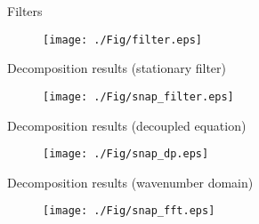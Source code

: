 \documentclass[aspectratio=43]{beamer}
\begin{document}
\begin{frame}{Filters}
   \begin{figure}[ht]
            \centering
            \texttt{[image: ./Fig/filter.eps]}
    \end{figure}
\end{frame}
\begin{frame}{Decomposition results (stationary filter)}
   \begin{figure}[ht]
            \centering
            \texttt{[image: ./Fig/snap\_filter.eps]}
    \end{figure}
\end{frame}
\begin{frame}{Decomposition results (decoupled equation)}
   \begin{figure}[ht]
            \centering
            \texttt{[image: ./Fig/snap\_dp.eps]}
    \end{figure}
\end{frame}
\begin{frame}{Decomposition results (wavenumber domain)}
   \begin{figure}[ht]
            \centering
            \texttt{[image: ./Fig/snap\_fft.eps]}
    \end{figure}
\end{frame}
\end{document}
